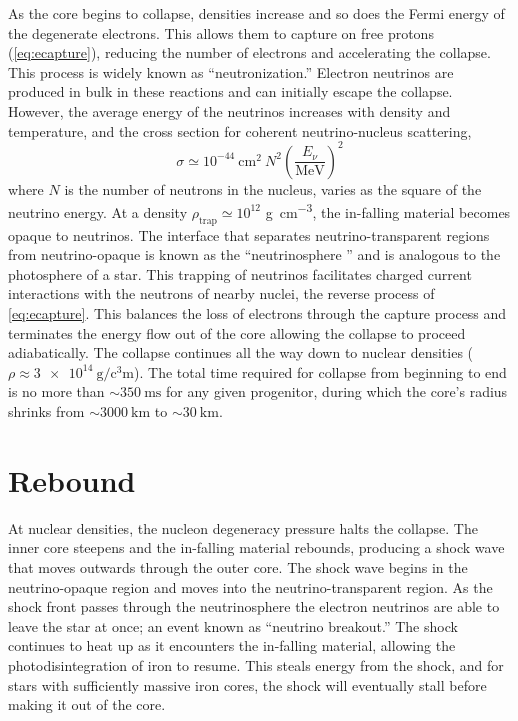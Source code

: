 		As the core begins to collapse, densities increase and so does the Fermi energy of the degenerate electrons. This allows them to capture on free protons (\EQ \ref{eq:ecapture}), reducing the number of electrons and accelerating the collapse. This process is widely known as ``neutronization.'' Electron neutrinos are produced in bulk in these reactions and can initially escape the collapse. However, the average energy of the neutrinos increases with density and temperature, and the cross section for coherent neutrino-nucleus scattering, 
		\begin{equation}
		\label{eq:nuScatXSection}
			\sigma \simeq 10^{-44} \ \text{cm}^2 \ N^2 \left(\frac{E_\nu}{\text{MeV}}\right)^2
		\end{equation}
		where $N$ is the number of neutrons in the nucleus, varies as the square of the neutrino energy. At a density $\rho_{\text{trap}} \simeq 10^{12}$ \si{\gram\per\cubic\centi\metre}, the in-falling material becomes opaque to neutrinos. The interface that separates neutrino-transparent regions from neutrino-opaque is known as the ``neutrinosphere
		'' and is analogous to the photosphere of a star. This trapping of neutrinos facilitates charged current interactions with the neutrons of nearby nuclei, the reverse process of \EQ \ref{eq:ecapture}. This balances the loss of electrons through the capture process and terminates the energy flow out of the core allowing the collapse to proceed adiabatically. The collapse continues all the way down to nuclear densities ($\rho \approx \SI{3e14}{\gram\per\cubic\centi\metre}$\cite{Janka2012,Janka2012a,particleastro}). The total time required for collapse from beginning to end is no more than $\sim\SI{350}{\milli\second}$ for any given progenitor\cite{Burrows2013}, during which the core's radius shrinks from $\sim \SI{3000}{\kilo\metre}$ to $\sim \SI{30}{\kilo\metre}$\cite{Woosley2006}.
	

	\section{Rebound}
		At nuclear densities, the nucleon degeneracy pressure halts the collapse. The inner core steepens and the in-falling material rebounds, producing a shock wave that moves outwards through the outer core. The shock wave begins in the neutrino-opaque region and moves into the neutrino-transparent region. As the shock front passes through the neutrinosphere the electron neutrinos are able to leave the star at once; an event known as ``neutrino breakout.'' The shock continues to heat up as it encounters the in-falling material, allowing the photodisintegration of iron to resume. This steals energy from the shock, and for stars with sufficiently massive iron cores, the shock will eventually stall before making it out of the core.

